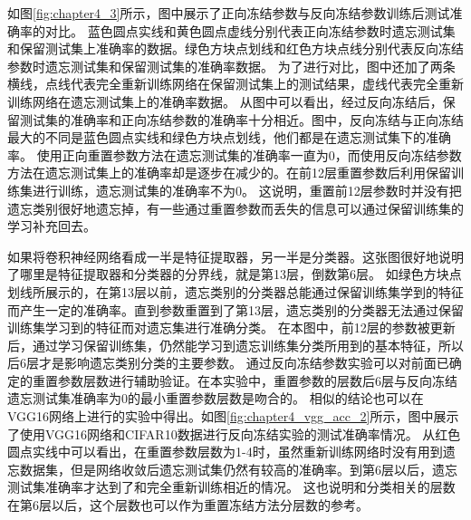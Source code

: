 如图\ref{fig:chapter4_3}所示，图中展示了正向冻结参数与反向冻结参数训练后测试准确率的对比。
蓝色圆点实线和黄色圆点虚线分别代表正向冻结参数时遗忘测试集和保留测试集上准确率的数据。绿色方块点划线和红色方块点线分别代表反向冻结参数时遗忘测试集和保留测试集的准确率数据。
为了进行对比，图中还加了两条横线，点线代表完全重新训练网络在保留测试集上的测试结果，虚线代表完全重新训练网络在遗忘测试集上的准确率数据。
从图中可以看出，经过反向冻结后，保留测试集的准确率和正向冻结参数的准确率十分相近。图中，反向冻结与正向冻结最大的不同是蓝色圆点实线和绿色方块点划线，他们都是在遗忘测试集下的准确率。
使用正向重置参数方法在遗忘测试集的准确率一直为0，而使用反向冻结参数方法在遗忘测试集上的准确率却是逐步在减少的。在前12层重置参数后利用保留训练集进行训练，遗忘测试集的准确率不为0。
这说明，重置前12层参数时并没有把遗忘类别很好地遗忘掉，有一些通过重置参数而丢失的信息可以通过保留训练集的学习补充回去。

如果将卷积神经网络看成一半是特征提取器，另一半是分类器。这张图很好地说明了哪里是特征提取器和分类器的分界线，就是第13层，倒数第6层。
如绿色方块点划线所展示的，在第13层以前，遗忘类别的分类器总能通过保留训练集学到的特征而产生一定的准确率。直到参数重置到了第13层，遗忘类别的分类器无法通过保留训练集学习到的特征而对遗忘集进行准确分类。
在本图中，前12层的参数被更新后，通过学习保留训练集，仍然能学习到遗忘训练集分类所用到的基本特征，所以后6层才是影响遗忘类别分类的主要参数。
通过反向冻结参数实验可以对前面已确定的重置参数层数进行辅助验证。在本实验中，重置参数的层数后6层与反向冻结遗忘测试集准确率为0的最小重置参数层数是吻合的。
相似的结论也可以在VGG16网络上进行的实验中得出。如图\ref{fig:chapter4_vgg_acc_2}所示，图中展示了使用VGG16网络和CIFAR10数据进行反向冻结实验的测试准确率情况。
从红色圆点实线中可以看出，在重置参数层数为1-4时，虽然重新训练网络时没有用到遗忘数据集，但是网络收敛后遗忘测试集仍然有较高的准确率。到第6层以后，遗忘测试集准确率才达到了和完全重新训练相近的情况。
这也说明和分类相关的层数在第6层以后，这个层数也可以作为重置冻结方法分层数的参考。

